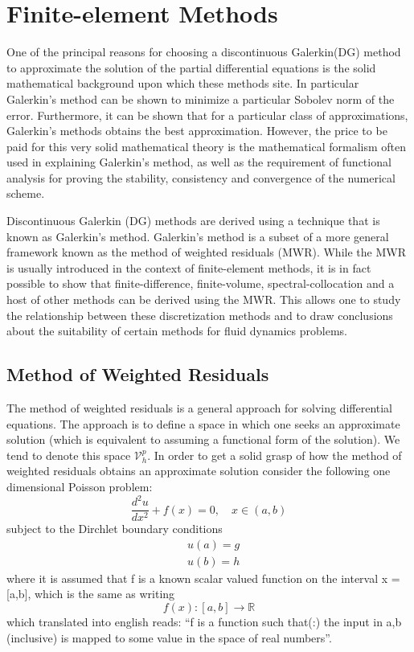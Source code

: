 \chapter{Finite-element Methods}
One of the principal reasons for choosing a discontinuous Galerkin(DG) method to approximate the solution of the partial differential equations is the solid mathematical background upon which these methods site.  In particular Galerkin's method can be shown to minimize a particular Sobolev norm of the error.  Furthermore, it can be shown that for a particular class of approximations, Galerkin's methods obtains the best approximation.  However, the price to be paid for this very solid mathematical theory is the mathematical formalism often used in explaining Galerkin's method, as well as the requirement of functional analysis for proving the stability, consistency and convergence of the numerical scheme.    

Discontinuous Galerkin (DG) methods are derived using a technique that is known as Galerkin's method.  Galerkin's method is a subset of a more general framework known as the method of weighted residuals (MWR).  While the MWR is usually introduced in the context of finite-element methods, it is in fact possible to show that finite-difference, finite-volume, spectral-collocation and a host of other methods can be derived using the MWR.  This allows one to study the relationship between these discretization methods and to draw conclusions about the suitability of certain methods for fluid dynamics problems.  

\section{Method of Weighted Residuals}
The method of weighted residuals is a general approach for solving differential equations.  The approach is to define a space in which one seeks an approximate solution (which is equivalent to  assuming a functional form of the solution).  We tend to denote this space $\mathcal{V}_{h}^{p}$.  In order to get a solid grasp of how the method of weighted residuals obtains an approximate solution consider the following one dimensional Poisson problem:
\begin{equation}\label{eq:c2_1dpoisson}
\frac{d^{2} u}{dx^{2}} + f(x) = 0, \quad x \in (a,b)
\end{equation}
subject to the Dirchlet boundary conditions
\begin{equation}
\begin{split}
& u(a) = g \\ 
& u(b) = h
\end{split}
\end{equation}
where it is assumed that f is a known scalar valued function on the interval  x = [a,b], which is the same as writing 
\begin{equation}
 f(x):[a,b] \rightarrow \mathbb{R} 
\end{equation}
which translated into english reads: ``f is a function such that(:) the input in a,b (inclusive) is mapped to some value in the space of real numbers''.  

